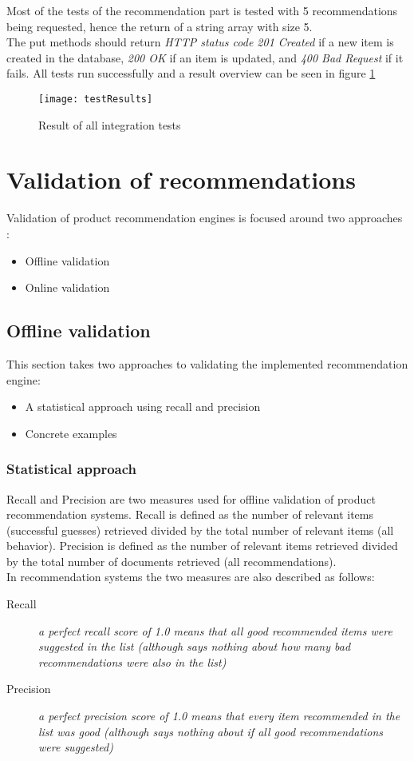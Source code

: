 Most of the tests of the recommendation part is tested with 5 recommendations being requested, hence the return of a string array with size 5. \\
The put methods should return \textit{HTTP status code 201 Created} if a new item is created in the database, \textit{200 OK} if an item is updated, and \textit{400 Bad Request} if it fails.
All tests run successfully and a result overview can be seen in figure \ref{testResult}
\begin{figure}[H]
\centering
\texttt{[image: testResults]}
\caption{Result of all integration tests}
\label{testResult}
\end{figure}


\section{Validation of recommendations}

Validation of product recommendation engines is focused around two approaches \cite{eval}:
\begin{itemize}
	\item Offline validation
	\item Online validation
\end{itemize}


\subsection{Offline validation}
This section takes two approaches to validating the implemented recommendation engine:
\begin{itemize}
	\item A statistical approach using recall and precision
	\item Concrete examples
\end{itemize}

\subsubsection{Statistical approach}
Recall and Precision are two measures used for offline validation of product recommendation systems. Recall is defined as the number of relevant items (successful guesses) retrieved divided by the total number of relevant items (all behavior). Precision is defined as the number of relevant items retrieved divided by the total number of documents retrieved (all recommendations). \\ In recommendation systems the two measures are also described as follows: 
\begin{description}
	\item [Recall] \textit{a perfect recall score of 1.0 means that all good recommended items were suggested in the list (although says nothing about how many bad recommendations were also in the list)} \cite{recallAndPrecision}
	\item [Precision] \textit{a perfect precision score of 1.0 means that every item recommended in the list was good (although says nothing about if all good recommendations were suggested)} \cite{recallAndPrecision}
\end{description}

